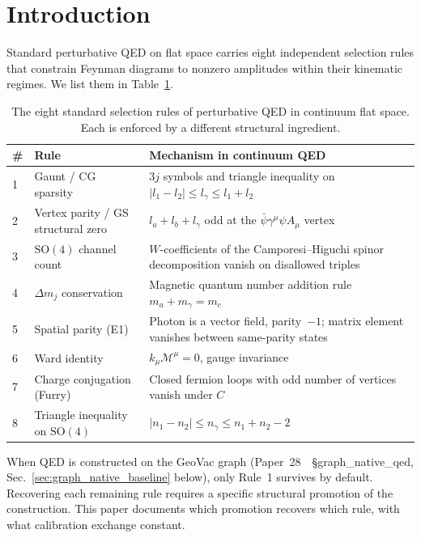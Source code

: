 \documentclass[11pt]{article}
\begin{document}
\section{Introduction}
\label{sec:intro}

Standard perturbative QED on flat space carries eight independent
selection rules that constrain Feynman diagrams to nonzero amplitudes
within their kinematic regimes.  We list them in
Table~\ref{tab:eight_rules}.

\begin{table}[h]
\centering
\small
\begin{tabular}{lll}
\toprule
\# & Rule & Mechanism in continuum QED \\
\midrule
1 & Gaunt / CG sparsity & 3$j$ symbols and triangle inequality on
$|l_1 - l_2| \le l_\gamma \le l_1 + l_2$ \\
2 & Vertex parity / GS structural zero & $l_a + l_b + l_\gamma$ odd at
the $\bar{\psi} \gamma^\mu \psi A_\mu$ vertex \\
3 & $\mathrm{SO}(4)$ channel count & $W$-coefficients of the
Camporesi--Higuchi spinor decomposition vanish on disallowed triples \\
4 & $\Delta m_j$ conservation & Magnetic quantum number addition rule
$m_a + m_\gamma = m_c$ \\
5 & Spatial parity (E1) & Photon is a vector field, parity~$-1$;
matrix element vanishes between same-parity states \\
6 & Ward identity & $k_\mu \mathcal{M}^\mu = 0$, gauge invariance \\
7 & Charge conjugation (Furry) & Closed fermion loops with odd number
of vertices vanish under $C$ \\
8 & Triangle inequality on $\mathrm{SO}(4)$ &
$|n_1 - n_2| \le n_\gamma \le n_1 + n_2 - 2$ \\
\bottomrule
\end{tabular}
\caption{The eight standard selection rules of perturbative QED in
continuum flat space.  Each is enforced by a different structural
ingredient.}
\label{tab:eight_rules}
\end{table}

When QED is constructed on the GeoVac graph
(Paper~28~\cite{paper28}~\S graph\_native\_qed,
Sec.~\ref{sec:graph_native_baseline} below), only Rule~1 survives by
default.  Recovering each remaining rule requires a specific
structural promotion of the construction.  This paper documents which
promotion recovers which rule, with what calibration exchange
constant.
\end{document}

